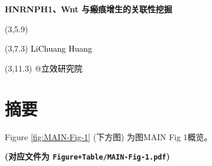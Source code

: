 \documentclass[
]{article}
\author{}
\date{\vspace{-2.5em}}
\begin{document}
\begin{titlepage} 
\begin{center} \textbf{\Huge HNRNPH1、Wnt
与瘢痕增生的关联性挖掘} \vspace{4em}
\begin{textblock}{10}(3,5.9) \huge
\textbf{\textcolor{white}{2024-06-20}}
\end{textblock} \begin{textblock}{10}(3,7.3)
\Large \textcolor{black}{LiChuang Huang}
\end{textblock} \begin{textblock}{10}(3,11.3)
\Large \textcolor{black}{@立效研究院}
\end{textblock} \end{center} \end{titlepage}
\restoregeometry


\begin{center}\vspace{1.5cm}\end{center}\tableofcontents

\begin{center}\vspace{1.5cm}\end{center}\listoffigures

\begin{center}\vspace{1.5cm}\end{center}\listoftables

\newpage


\hypertarget{abstract}{%
\section{摘要}\label{abstract}}

\begin{center}\vspace{1.5cm}\end{center}

Figure \ref{fig:MAIN-Fig-1} (下方图) 为图MAIN Fig 1概览。

\textbf{(对应文件为 \texttt{Figure+Table/MAIN-Fig-1.pdf})}
\end{document}
